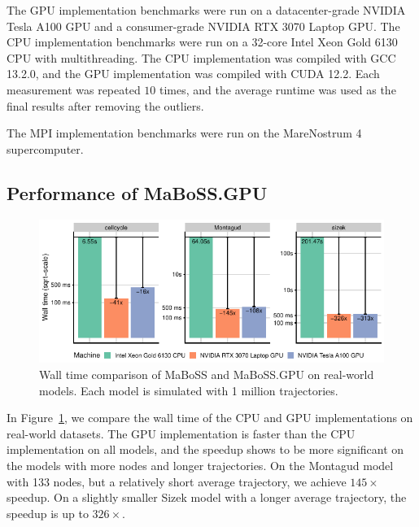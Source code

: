 \documentclass[a4paper,num-refs]{oup-contemporary}
\begin{document}
The GPU implementation benchmarks were run on a datacenter-grade NVIDIA Tesla A100 GPU and a consumer-grade NVIDIA RTX 3070 Laptop GPU. The CPU implementation benchmarks were run on a 32-core Intel Xeon Gold 6130 CPU with multithreading. The CPU implementation was compiled with GCC 13.2.0, and the GPU implementation was compiled with CUDA 12.2. Each measurement was repeated $10$ times, and the average runtime was used as the final results after removing the outliers.

The MPI implementation benchmarks were run on the MareNostrum 4 supercomputer.

\subsection{Performance of MaBoSS.GPU}

\begin{figure}
    \centering
    \includegraphics[width=\linewidth]{Figures/real.pdf}
    \caption{Wall time comparison of MaBoSS and MaBoSS.GPU on real-world models. Each model is simulated with 1 million trajectories.}
    \label{fig:real}
\end{figure}

In Figure~\ref{fig:real}, we compare the wall time of the CPU and GPU implementations on real-world datasets. The GPU implementation is faster than the CPU implementation on all models, and the speedup shows to be more significant on the models with more nodes and longer trajectories. On the Montagud model with 133 nodes, but a relatively short average trajectory, we achieve $145\times$ speedup. On a slightly smaller Sizek model with a longer average trajectory, the speedup is up to $326\times$. 
\end{document}
